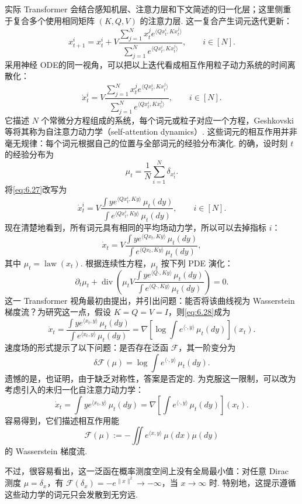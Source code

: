 实际 Transformer 会结合感知机层、注意力层和下文简述的归一化层；这里侧重于复合多个使用相同矩阵 $(K,Q,V)$ 的注意力层. 这一复合产生词元迭代更新：
$$
x_{t+1}^i=x_t^i+V\frac{\sum_{j=1}^Nx_t^je^{\langle Qx_t^i,Kx_t^j\rangle}}
{\sum_{j=1}^Ne^{\langle Qx_t^i,Kx_t^j\rangle}},\qquad i\in[N].
$$
采用神经 ODE\cite{ref68}的同一视角，可以把以上迭代看成相互作用粒子动力系统的时间离散化：
\begin{equation}\label{eq:6.27}
\dot x_t^i=V\frac{\sum_{j=1}^Nx_t^je^{\langle Qx_t^i,Kx_t^j\rangle}}
{\sum_{j=1}^Ne^{\langle Qx_t^i,Kx_t^j\rangle}},\qquad i\in[N].
\end{equation}
它描述 $N$ 个常微分方程组成的系统，每个词元或粒子对应一个方程，Geshkovski 等\cite{ref143,ref144}将其称为自注意力动力学（self-attention dynamics）. 这些词元的相互作用并非毫无规律：每个词元根据自己的位置与全部词元的经验分布演化. 的确，设时刻 $t$ 的经验分布为
$$
\mu_t=\frac1N\sum_{i=1}^N\delta_{x_t^i}.
$$
将\eqref{eq:6.27}改写为
$$
\dot x_t^i=V\frac{\int ye^{\langle Qx_t^i,Ky\rangle}\,\mu_t(dy)}
{\int e^{\langle Qx_t^i,Ky\rangle}\,\mu_t(dy)},\qquad i\in[N].
$$
现在清楚地看到，所有词元具有相同的平均场动力学，所以可以去掉指标 $i$：
\begin{equation}\label{eq:6.28}
\dot x_t=V\frac{\int ye^{\langle Qx_t,Ky\rangle}\,\mu_t(dy)}
{\int e^{\langle Qx_t,Ky\rangle}\,\mu_t(dy)},
\end{equation}
其中 $\mu_t=\operatorname{law}(x_t)$. 根据连续性方程，$\mu_t$ 按下列 PDE 演化：
$$
\partial_t\mu_t+\operatorname{div}\left(\mu_tV
\frac{\int ye^{\langle Q\cdot,Ky\rangle}\,\mu_t(dy)}
{\int e^{\langle Q\cdot,Ky\rangle}\,\mu_t(dy)}\right)=0.
$$
这一 Transformer 视角最初由\cite{ref280}提出，并引出问题：能否将该曲线视为 Wasserstein 梯度流？为研究这一点，假设 $K=Q=V=I$，则\eqref{eq:6.28}成为
$$
\dot x_t=\frac{\int ye^{\langle x_t,y\rangle}\,\mu_t(dy)}
{\int e^{\langle x_t,y\rangle}\,\mu_t(dy)}
=\nabla\left[\log\int e^{\langle\cdot,y\rangle}\,\mu_t(dy)\right](x_t).
$$
速度场的形式提示了以下问题：是否存在泛函 $\mathcal F$，其一阶变分为
$$
\delta\mathcal F(\mu)=\log\int e^{\langle\cdot,y\rangle}\,\mu_t(dy).
$$
遗憾的是，\cite{ref280}也证明，由于缺乏对称性，答案是否定的. 为克服这一限制，可以改为考虑\cite{ref144}引入的未归一化自注意力动力学：
$$
\dot x_t=\int ye^{\langle x_t,y\rangle}\,\mu_t(dy)
=\nabla\left[\int e^{\langle\cdot,y\rangle}\,\mu_t(dy)\right](x_t).
$$
容易得到，它们描述相互作用能
$$
\mathcal F(\mu):=-\iint e^{\langle x,y\rangle}\,\mu(dx)\mu(dy)
$$
的 Wasserstein 梯度流.

不过，很容易看出，这一泛函在概率测度空间上没有全局最小值：对任意 Dirac 测度 $\mu=\delta_x$，有 $\mathcal F(\delta_x)=-e^{\|x\|^2}\to-\infty$，当 $x\to\infty$ 时. 特别地，这提示遵循这些动力学的词元只会发散到无穷远.

